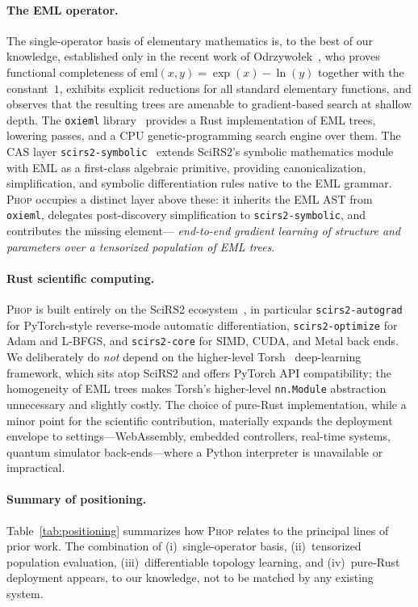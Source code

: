 \documentclass{article}
\begin{document}
\paragraph{The EML operator.}
The single-operator basis of elementary mathematics is, to the best of
our knowledge, established only in the recent work of
Odrzywo\l{}ek~\cite{odrzywolek2026eml}, who proves functional
completeness of $\mathrm{eml}(x,y)=\exp(x)-\ln(y)$ together with
the constant~$1$, exhibits explicit reductions for all standard
elementary functions, and observes that the resulting trees are
amenable to gradient-based search at shallow depth. The \texttt{oxieml}
library~\cite{oxieml2026} provides a Rust implementation of EML trees,
lowering passes, and a CPU genetic-programming search engine over them.
The CAS layer \texttt{scirs2-symbolic}~\cite{scirs2symbolic} extends
SciRS2's symbolic mathematics module with EML as a first-class
algebraic primitive, providing canonicalization, simplification, and
symbolic differentiation rules native to the EML grammar.
\textsc{Phop} occupies a distinct layer above these: it inherits the
EML AST from \texttt{oxieml}, delegates post-discovery simplification
to \texttt{scirs2-symbolic}, and contributes the missing element—%
\emph{end-to-end gradient learning of structure and parameters over a
tensorized population of EML trees}.

\paragraph{Rust scientific computing.}
\textsc{Phop} is built entirely on the SciRS2
ecosystem~\cite{scirs2}, in particular \texttt{scirs2-autograd} for
PyTorch-style reverse-mode automatic differentiation,
\texttt{scirs2-optimize} for Adam and L-BFGS, and \texttt{scirs2-core}
for SIMD, CUDA, and Metal back ends. We deliberately do \emph{not}
depend on the higher-level Torsh~\cite{torsh} deep-learning framework,
which sits atop SciRS2 and offers PyTorch API compatibility; the
homogeneity of EML trees makes Torsh's higher-level \texttt{nn.Module}
abstraction unnecessary and slightly costly. The choice of pure-Rust
implementation, while a minor point for the scientific contribution,
materially expands the deployment envelope to settings—WebAssembly,
embedded controllers, real-time systems, quantum simulator
back-ends—where a Python interpreter is unavailable or impractical.

\paragraph{Summary of positioning.}
Table~\ref{tab:positioning} summarizes how \textsc{Phop} relates to
the principal lines of prior work. The combination of
(i)~single-operator basis, (ii)~tensorized population evaluation,
(iii)~differentiable topology learning, and (iv)~pure-Rust deployment
appears, to our knowledge, not to be matched by any existing system.
\end{document}
